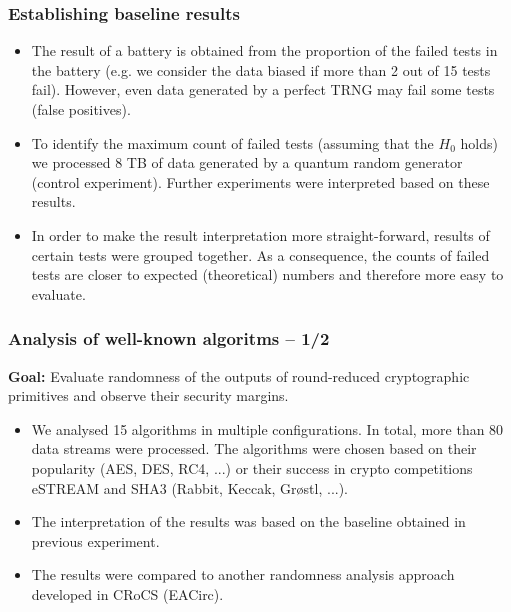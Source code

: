 \documentclass[aspectratio=169]{beamer}
\begin{document}
\begin{frame}
\frametitle{Establishing baseline results}
\begin{itemize}
\item The result of a battery is obtained from the proportion of the failed tests in the battery (e.g. we consider the data biased if more than 2 out of 15 tests fail). However, even data generated by a perfect TRNG may fail some tests (false positives).
\item To identify the maximum count of failed tests (assuming that the $H_0$ holds) we processed 8 TB of data generated by a quantum random generator (control experiment). Further experiments were interpreted based on these results.
\item In order to make the result interpretation more straight-forward, results of certain tests were grouped together. As a consequence, the counts of failed tests are closer to expected (theoretical) numbers and therefore more easy to evaluate.
\end{itemize}
\end{frame}

\begin{frame}
\frametitle{Analysis of well-known algoritms -- 1/2}
\textbf{Goal: } Evaluate randomness of the outputs of round-reduced cryptographic primitives and observe their security margins.
\vspace{.3cm}
\begin{itemize}
\item We analysed 15 algorithms in multiple configurations. In total, more than 80 data streams were processed. The algorithms were chosen based on their popularity (AES, DES, RC4, ...) or their success in crypto competitions eSTREAM and SHA3 (Rabbit, Keccak, Gr\o stl, ...).
\item The interpretation of the results was based on the baseline obtained in previous experiment.
\item The results were compared to another randomness analysis approach developed in CRoCS (EACirc).
\end{itemize}
\end{frame}
\end{document}
